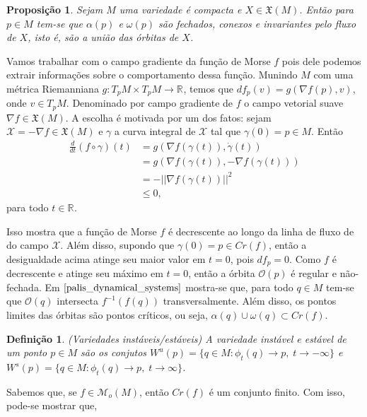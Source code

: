 \documentclass[12pt]{book}
\newtheorem{definicao}[teorema]{Definição}
\newtheorem{proposicao}[teorema]{Proposição}
\newcommand{\campogradiente}{\mathcal{X}}
\newcommand{\campossuaves}[1]{\mathfrak{X}(#1)}
\newcommand{\derivada}[2]{\frac{d #1}{d #2}}
\newcommand{\funcoesmorse}[1]{\mathcal{M}_{o}(#1)}
\newcommand{\gradiente}{\nabla f}
\newcommand{\norma}[1]{||#1||}
\newcommand{\orbitaponto}[1]{\mathcal{O}(#1)}
\newcommand{\pontoscriticos}[1]{\textit{Cr}(#1)}
\newcommand{\real}[1]{\mathbb{R}^{#1}}
\newcommand{\reta}{\real{}}
\newcommand{\variedadeestavel}[1]{W^{s}(#1)}
\newcommand{\variedadeinstavel}[1]{W^{u}(#1)}
\begin{document}
	\begin{proposicao}
		Sejam $M$ uma variedade é compacta e $X\in \campossuaves{M}$. Então para $p \in M$ tem-se que $\alpha(p)$ e $\omega(p)$ são fechados, conexos e invariantes pelo fluxo de $X$, isto é, são a união das órbitas de $X$.
	\end{proposicao}
	
	Vamos trabalhar com o campo gradiente da função de Morse $f$ pois dele podemos extrair informações sobre o comportamento dessa função. Munindo $M$ com uma métrica Riemanniana $g: T_{p}M \times T_{p}M \to \reta$, temos que $df_{p}(v) = g(\nabla f(p), v)$, onde $v \in T_{p}M$. Denominado por campo gradiente de $f$ o campo vetorial suave $\nabla f \in \campossuaves{M}$. A escolha é motivada por um dos fatos: sejam $\campogradiente = -\gradiente \in \campossuaves{M}$ e $\gamma$ a curva integral de $\campogradiente$ tal que $\gamma(0) = p\in M$. Então
	$$
	\begin{aligned}
	\derivada{}{t}(f \circ \gamma)(t) &= g(\gradiente(\gamma(t)), \dot{\gamma}(t)) 
	\\
	&=g(\gradiente(\gamma(t)), -\gradiente(\gamma(t))) 
	\\
	&= -\norma{\gradiente(\gamma(t))}^{2}
	\\
	&\leq 0,
	\end{aligned}
	$$
	para todo $t \in \reta$.
	
	Isso mostra que a função de Morse $f$ é decrescente ao longo da linha de fluxo de do campo $\campogradiente$. Além disso, supondo que $\gamma(0) =p\in \pontoscriticos{f}$, então a desigualdade acima atinge seu maior valor em $t=0$, pois $df_{p }= 0$. Como $f$ é decrescente e atinge seu máximo em $t=0$, então a órbita $\orbitaponto{p}$ é regular e não-fechada. Em $\cite{palis_dynamical_systems}$ mostra-se que, para todo $q \in M$ tem-se que $\orbitaponto{q}$ intersecta $f^{-1}(f(q))$ transversalmente. Além disso, os pontos limites das órbitas são pontos críticos, ou seja, $\alpha(q)\cup\omega(q) \subset \pontoscriticos{f}$.
	
	
	\begin{definicao}
		(Variedades instáveis/estáveis)  A variedade instável e estável de um ponto $p \in M$ são os conjutos $\variedadeinstavel{p} = \{q\in M: \phi_{t}(q) \to p,\; t\to -\infty\}$ e $\variedadeestavel{p} = \{q\in M: \phi_{t}(q) \to p,\; t\to \infty\}$.
	\end{definicao}
	
	Sabemos que, se $f \in \funcoesmorse{M}$, então $\pontoscriticos{f}$ é um conjunto finito. Com isso, pode-se mostrar que, 
	
\end{document}
